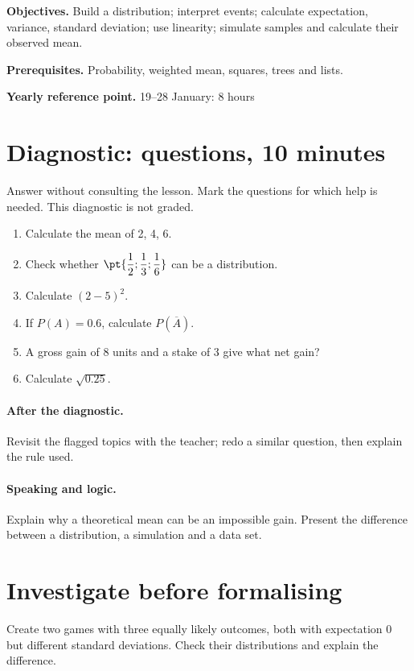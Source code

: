 \label{C08}
\begin{keypoint}
\textbf{Objectives.} Build a distribution; interpret events; calculate expectation, variance, standard deviation; use linearity; simulate samples and calculate their observed mean.

\textbf{Prerequisites.} Probability, weighted mean, squares, trees and lists.

\textbf{Yearly reference point.} 19--28 January: 8 hours\end{keypoint}
\section*{Diagnostic:  questions, 10 minutes}\label{C08-D}
Answer without consulting the lesson. Mark the questions for which help is needed. This diagnostic is not graded.
\begin{enumerate}
\item Calculate the mean of 2, 4, 6.
\item Check whether $\pt{\dfrac{1}{2};\dfrac{1}{3};\dfrac{1}{6}}$ can be a distribution.
\item Calculate $(2-5)^2$.
\item If $P(A)=\num{0,6}$, calculate $P(\overline A)$.
\item A gross gain of 8 units and a stake of 3 give what net gain?
\item Calculate $\sqrt{\num{0,25}}$.
\end{enumerate}
\paragraph{After the diagnostic.} Revisit the flagged topics with the teacher; redo a similar question, then explain the rule used.
\paragraph{Speaking and logic.} Explain why a theoretical mean can be an impossible gain. Present the difference between a distribution, a simulation and a data set.
\mxnewpage
\section*{Investigate before formalising}\label{C08-RECH}
Create two games with three equally likely outcomes, both with expectation 0 but different standard deviations. Check their distributions and explain the difference.
